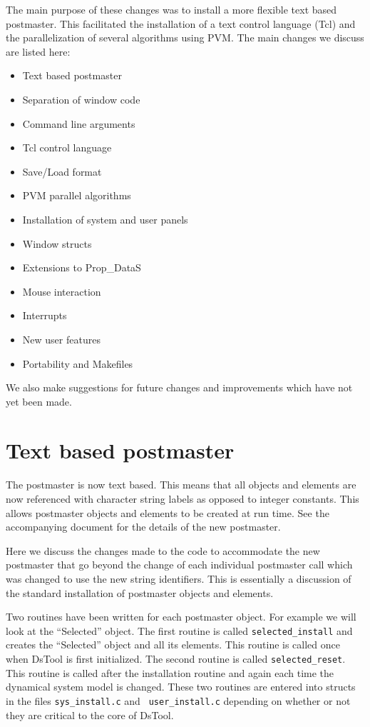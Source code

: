The main purpose of these changes was to install a more flexible
text based postmaster.  This facilitated the installation of
a text control language (Tcl) and the parallelization of
several algorithms using PVM.  The main changes we discuss
are listed here:
\begin{itemize}
\item Text based postmaster
\item Separation of window code
\item Command line arguments
\item Tcl control language
\item Save/Load format
\item PVM parallel algorithms
\item Installation of system and user panels
\item Window structs
\item Extensions to Prop\_DataS
\item Mouse interaction
\item Interrupts
\item New user features
\item Portability and Makefiles

\end{itemize}
We also make suggestions for future changes and improvements which have not
yet been made.



\section{Text based postmaster}

The postmaster is now text based.  This means that all objects
and elements are now referenced with character string labels
as opposed to integer constants.  This allows postmaster
objects and elements to be created at run time.  See the accompanying
document for the details of the new postmaster.

Here we discuss the changes made to the code to accommodate the new
postmaster that go beyond the change of each individual postmaster
call which was changed to use the new string identifiers.  This
is essentially a discussion of the standard installation of postmaster
objects and elements.

Two routines have been written for each postmaster object.  For
example we will look at the ``Selected'' object.  The first routine is
called {\tt selected\_install} and creates the ``Selected'' object and
all its elements.  This routine is called once when DsTool is first
initialized.  The second routine is called {\tt selected\_reset}. This
routine is called after the installation routine and again each
time the dynamical system model is changed.  These two routines are
entered into structs in the files {\tt sys\_install.c} and {\tt
user\_install.c} depending on whether or not they are critical to the
core of DsTool.

